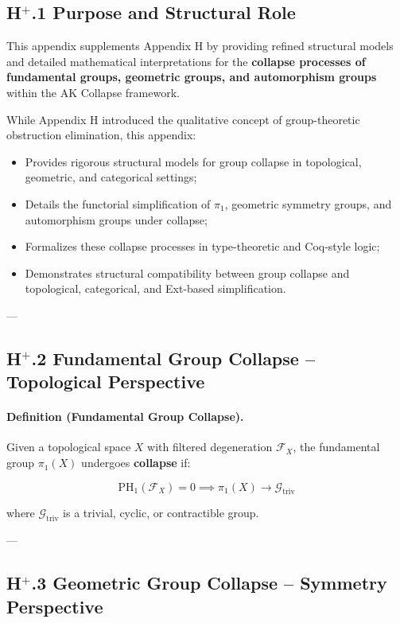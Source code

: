 \documentclass[11pt]{article}
\begin{document}
\subsection*{H$^{+}$.1 Purpose and Structural Role}

This appendix supplements Appendix H by providing refined structural models and detailed mathematical interpretations for the \textbf{collapse processes of fundamental groups, geometric groups, and automorphism groups} within the AK Collapse framework.

While Appendix H introduced the qualitative concept of group-theoretic obstruction elimination, this appendix:

\begin{itemize}
    \item Provides rigorous structural models for group collapse in topological, geometric, and categorical settings;
    \item Details the functorial simplification of $\pi_1$, geometric symmetry groups, and automorphism groups under collapse;
    \item Formalizes these collapse processes in type-theoretic and Coq-style logic;
    \item Demonstrates structural compatibility between group collapse and topological, categorical, and Ext-based simplification.
\end{itemize}

---

\subsection*{H$^{+}$.2 Fundamental Group Collapse – Topological Perspective}

\paragraph{Definition (Fundamental Group Collapse).}

Given a topological space $X$ with filtered degeneration $\mathcal{F}_X$, the fundamental group $\pi_1(X)$ undergoes \textbf{collapse} if:

\[
\mathrm{PH}_1(\mathcal{F}_X) = 0 \implies \pi_1(X) \longrightarrow \mathcal{G}_{\mathrm{triv}}
\]

where $\mathcal{G}_{\mathrm{triv}}$ is a trivial, cyclic, or contractible group.

---

\subsection*{H$^{+}$.3 Geometric Group Collapse – Symmetry Perspective}
\end{document}
